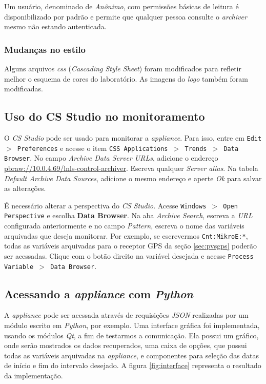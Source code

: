 \vspace{12pt}

Um usuário, denominado de \textit{Anônimo}, com permissões básicas de leitura é
disponibilizado por padrão e permite que qualquer pessoa consulte o
\textit{archiver} mesmo não estando autenticada.

\subsubsection{Mudanças no estilo}

Alguns arquivos \textit{css} (\textit{Cascading Style Sheet}) foram modificados
para refletir melhor o esquema de cores do laboratório. As imagens do
\textit{logo} também foram modificadas.

\subsection{Uso do CS Studio no monitoramento} \label{appliance-csstudio}

O \textit{CS Studio} pode ser usado para monitorar a \textit{appliance}. Para
isso, entre em \texttt{Edit \(>\) Preferences} e acesse o item \texttt{CSS
Applications \(>\) Trends \(>\) Data Browser}. No campo \textit{Archive Data
Server URLs}, adicione o endereço \url{pbraw://10.0.4.69/lnls-control-archiver}.
Escreva qualquer \textit{Server alias}. Na tabela \textit{Default Archive Data
Sources}, adicione o mesmo endereço e aperte \textit{Ok} para salvar as alterações.

\vspace{12pt}

É necessário alterar a perspectiva do \textit{CS Studio}. Acesse
\texttt{Windows \(>\) Open Perspective} e escolha \textbf{Data Browser}. Na aba
\textit{Archive Search}, escreva a \textit{URL} configurada anteriormente e no
campo \textit{Pattern}, escreva o nome das variáveis arquivadas que deseja
monitorar. Por exemplo, se escrevermos \texttt{Cnt:MikroE:*}, todas as variáveis
arquivadas para o receptor GPS da seção \ref{sec:pvsgps} poderão ser acessadas.
Clique com o botão direito na variável desejada e acesse \texttt{Process Variable \(>\) Data Browser}.

\subsection{Acessando a \textit{appliance} com \textit{Python}}

A \textit{appliance} pode ser acessada através de requisições \textit{JSON}
realizadas por um módulo escrito em \textit{Python}, por exemplo. Uma interface
gráfica foi implementada, usando os módulos \textit{Qt}, a fim de testarmos a
comunicação. Ela possui um gráfico, onde serão mostrados os dados recuperados,
uma caixa de opções, que possui todas as variáveis arquivadas na
\textit{appliance}, e componentes para seleção das datas de início e fim do
intervalo desejado. A figura \ref{fig:interface} representa o resultado da
implementação.

